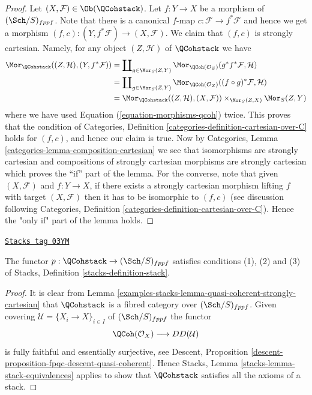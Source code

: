 \begin{proof}
Let $(X, \mathcal{F}) \in \Ob(\QCohstack)$.
Let $f : Y \to X$ be a morphism of $(\Sch/S)_{fppf}$.
Note that there is a canonical $f$-map $c : \mathcal{F} \to f^*\mathcal{F}$
and hence we get a morphism
$(f, c) : (Y, f^*\mathcal{F}) \to (X, \mathcal{F})$.
We claim that $(f, c)$ is strongly cartesian.
Namely, for any object $(Z, \mathcal{H})$ of $\QCohstack$ we have
\begin{align*}
\Mor_{\QCohstack}((Z, \mathcal{H}), (Y, f^*\mathcal{F}))
& =
\coprod\nolimits_{g \in \Mor_S(Z, Y)}
\Mor_{\QCoh(\mathcal{O}_Z)}(g^*f^*\mathcal{F}, \mathcal{H}) \\
& =
\coprod\nolimits_{g \in \Mor_S(Z, Y)}
\Mor_{\QCoh(\mathcal{O}_Z)}((f \circ g)^*\mathcal{F}, \mathcal{H}) \\
& =
\Mor_{\QCohstack}((Z, \mathcal{H}), (X, \mathcal{F}))
\times_{\Mor_S(Z, X)} \Mor_S(Z, Y)
\end{align*}
where we have used Equation (\ref{equation-morphisms-qcoh}) twice.
This proves that the condition of
Categories, Definition \ref{categories-definition-cartesian-over-C}
holds for $(f, c)$, and hence our claim is true. Now by
Categories, Lemma \ref{categories-lemma-composition-cartesian}
we see that isomorphisms are strongly cartesian and
compositions of strongly cartesian morphisms are strongly cartesian
which proves the ``if'' part of the lemma. For the converse, note
that given $(X, \mathcal{F})$ and $f : Y \to X$, if there exists a
strongly cartesian morphism lifting $f$ with target $(X, \mathcal{F})$
then it has to be isomorphic to $(f, c)$ (see discussion following
Categories, Definition \ref{categories-definition-cartesian-over-C}).
Hence the "only if" part of the lemma holds.
\end{proof}

\begin{lemma}
\label{examples-stacks-lemma-stack-of-quasi-coherent-sheaves}
\href{https://stacks.math.columbia.edu/tag/03YM}{\texttt{Stacks tag 03YM}}

The functor $p : \QCohstack \to (\Sch/S)_{fppf}$
satisfies conditions (1), (2) and (3) of
Stacks, Definition \ref{stacks-definition-stack}.
\end{lemma}

\begin{proof}
It is clear from
Lemma \ref{examples-stacks-lemma-quasi-coherent-strongly-cartesian}
that $\QCohstack$ is a fibred category over $(\Sch/S)_{fppf}$.
Given covering $\mathcal{U} = \{X_i \to X\}_{i \in I}$ of
$(\Sch/S)_{fppf}$ the functor
$$
\QCoh(\mathcal{O}_X) \longrightarrow DD(\mathcal{U})
$$
is fully faithful and essentially surjective, see
Descent, Proposition \ref{descent-proposition-fpqc-descent-quasi-coherent}.
Hence
Stacks, Lemma \ref{stacks-lemma-stack-equivalences}
applies to show that $\QCohstack$ satisfies all the
axioms of a stack.
\end{proof}

